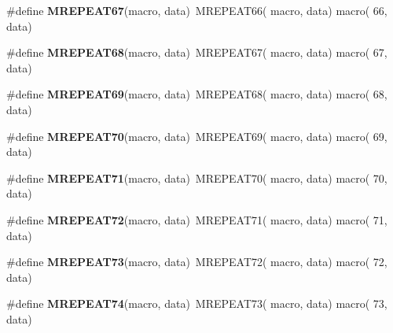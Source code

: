 \begin{DoxyCompactItemize}
\item 
\hypertarget{group__group__xmega__utils__mrepeat_ga4cb1fbebc5e11842a5e69ce245997668}{\#define {\bfseries M\-R\-E\-P\-E\-A\-T67}(macro, data)~M\-R\-E\-P\-E\-A\-T66( macro, data)   macro( 66, data)}\label{group__group__xmega__utils__mrepeat_ga4cb1fbebc5e11842a5e69ce245997668}

\item 
\hypertarget{group__group__xmega__utils__mrepeat_ga1f925f41c5c5e044e274c24fd24f3416}{\#define {\bfseries M\-R\-E\-P\-E\-A\-T68}(macro, data)~M\-R\-E\-P\-E\-A\-T67( macro, data)   macro( 67, data)}\label{group__group__xmega__utils__mrepeat_ga1f925f41c5c5e044e274c24fd24f3416}

\item 
\hypertarget{group__group__xmega__utils__mrepeat_gaf5b5c7b140c272560551ca6b6b37256c}{\#define {\bfseries M\-R\-E\-P\-E\-A\-T69}(macro, data)~M\-R\-E\-P\-E\-A\-T68( macro, data)   macro( 68, data)}\label{group__group__xmega__utils__mrepeat_gaf5b5c7b140c272560551ca6b6b37256c}

\item 
\hypertarget{group__group__xmega__utils__mrepeat_ga677da95097e98df0ab8d600dc490e39a}{\#define {\bfseries M\-R\-E\-P\-E\-A\-T70}(macro, data)~M\-R\-E\-P\-E\-A\-T69( macro, data)   macro( 69, data)}\label{group__group__xmega__utils__mrepeat_ga677da95097e98df0ab8d600dc490e39a}

\item 
\hypertarget{group__group__xmega__utils__mrepeat_ga702fd0113374ea1ce97cbc50be2332f9}{\#define {\bfseries M\-R\-E\-P\-E\-A\-T71}(macro, data)~M\-R\-E\-P\-E\-A\-T70( macro, data)   macro( 70, data)}\label{group__group__xmega__utils__mrepeat_ga702fd0113374ea1ce97cbc50be2332f9}

\item 
\hypertarget{group__group__xmega__utils__mrepeat_gab6f74943a635c95e80aaf53e744212fd}{\#define {\bfseries M\-R\-E\-P\-E\-A\-T72}(macro, data)~M\-R\-E\-P\-E\-A\-T71( macro, data)   macro( 71, data)}\label{group__group__xmega__utils__mrepeat_gab6f74943a635c95e80aaf53e744212fd}

\item 
\hypertarget{group__group__xmega__utils__mrepeat_gac9174dbacb9c007ef48316a965f67118}{\#define {\bfseries M\-R\-E\-P\-E\-A\-T73}(macro, data)~M\-R\-E\-P\-E\-A\-T72( macro, data)   macro( 72, data)}\label{group__group__xmega__utils__mrepeat_gac9174dbacb9c007ef48316a965f67118}

\item 
\hypertarget{group__group__xmega__utils__mrepeat_ga87d76594b00b293cc7221f7de33e1a41}{\#define {\bfseries M\-R\-E\-P\-E\-A\-T74}(macro, data)~M\-R\-E\-P\-E\-A\-T73( macro, data)   macro( 73, data)}\label{group__group__xmega__utils__mrepeat_ga87d76594b00b293cc7221f7de33e1a41}


\end{DoxyCompactItemize}
